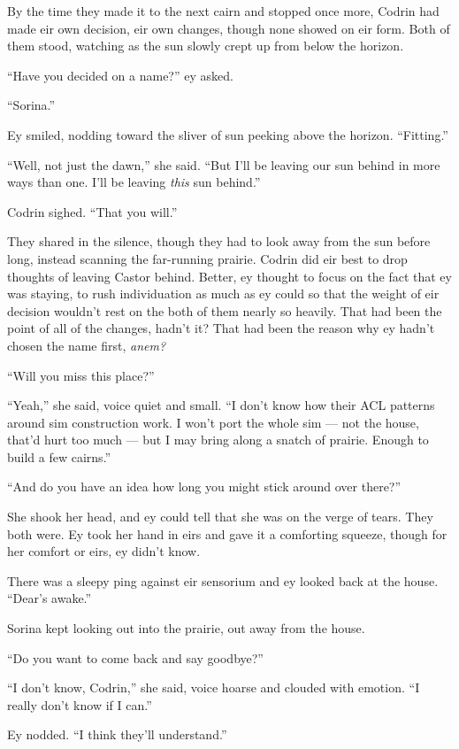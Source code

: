 By the time they made it to the next cairn and stopped once more, Codrin had made eir own decision, eir own changes, though none showed on eir form. Both of them stood, watching as the sun slowly crept up from below the horizon.

``Have you decided on a name?'' ey asked.

``Sorina.''

Ey smiled, nodding toward the sliver of sun peeking above the horizon. ``Fitting.''

``Well, not just the dawn,'' she said. ``But I'll be leaving our sun behind in more ways than one. I'll be leaving \emph{this} sun behind.''

Codrin sighed. ``That you will.''

They shared in the silence, though they had to look away from the sun before long, instead scanning the far-running prairie. Codrin did eir best to drop thoughts of leaving Castor behind. Better, ey thought to focus on the fact that ey was staying, to rush individuation as much as ey could so that the weight of eir decision wouldn't rest on the both of them nearly so heavily. That had been the point of all of the changes, hadn't it? That had been the reason why ey hadn't chosen the name first, \emph{anem?}

``Will you miss this place?''

``Yeah,'' she said, voice quiet and small. ``I don't know how their ACL patterns around sim construction work. I won't port the whole sim — not the house, that'd hurt too much — but I may bring along a snatch of prairie. Enough to build a few cairns.''

``And do you have an idea how long you might stick around over there?''

She shook her head, and ey could tell that she was on the verge of tears. They both were. Ey took her hand in eirs and gave it a comforting squeeze, though for her comfort or eirs, ey didn't know.

There was a sleepy ping against eir sensorium and ey looked back at the house. ``Dear's awake.''

Sorina kept looking out into the prairie, out away from the house.

``Do you want to come back and say goodbye?''

``I don't know, Codrin,'' she said, voice hoarse and clouded with emotion. ``I really don't know if I can.''

Ey nodded. ``I think they'll understand.''

